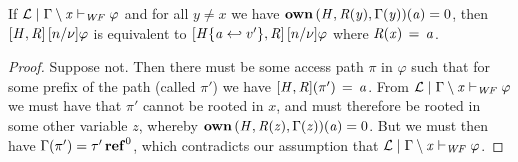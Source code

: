 \documentclass[runningheads]{llncs}
\begin{document}
\begin{lemma}\label{lemma:framed-update-pred}
  If $ \mathcal{L}   \mid    \Gamma  \setminus  \mathit{x}    \vdash _{\mathit{WF}}  \varphi $ and for all $y \neq x$ we have
  $\mathbf{own} \, (  \mathit{H}  ,  \mathit{R}  (  \mathit{y}  )  ,  \Gamma  (  \mathit{y}  )  )  (  \mathit{a}  )  =  0$, then $[  \mathit{H}  ,  \mathit{R}  ] \, [  n  /  \nu  ]  \varphi$
  is equivalent to $[  \mathit{H}  \{  \mathit{a}  \hookleftarrow  v'  \}  ,  \mathit{R}  ] \, [  n  /  \nu  ]  \varphi$ where $\mathit{R}  (  \mathit{x}  ) \, = \, \mathit{a}$.
\end{lemma}
\begin{proof}
  Suppose not. Then there must be some access path $\pi$ in $\varphi$ such that
  for some prefix of the path (called $\pi'$) we have $[  \mathit{H}  ,  \mathit{R}  ]  (  \pi'  ) \, = \, \mathit{a}$. From
  $ \mathcal{L}   \mid    \Gamma  \setminus  \mathit{x}    \vdash _{\mathit{WF}}  \varphi $ we must have that $\pi'$ cannot be rooted in $\mathit{x}$,
  and must therefore be rooted in some other variable $\mathit{z}$, whereby
  $\mathbf{own} \, (  \mathit{H}  ,  \mathit{R}  (  \mathit{z}  )  ,  \Gamma  (  \mathit{z}  )  )  (  \mathit{a}  )  =  0$. But we must then have $\Gamma  (  \pi'  )  =   \tau'  \operatorname{\mathbf{ref}}^{ 0 } $, which
  contradicts our assumption that $ \mathcal{L}   \mid    \Gamma  \setminus  \mathit{x}    \vdash _{\mathit{WF}}  \varphi $.
\end{proof}
\end{document}
